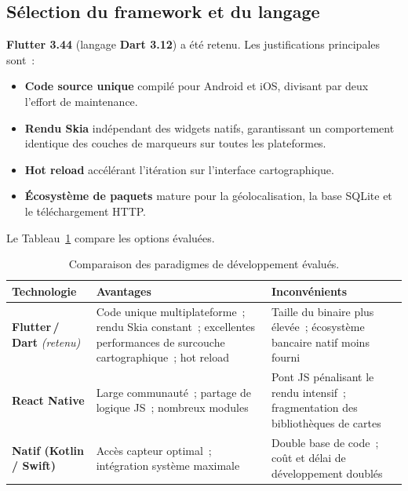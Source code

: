 \documentclass[11pt,a4paper]{article}
\begin{document}
\subsection{S\'election du framework et du langage}
\textbf{Flutter 3.44} (langage \textbf{Dart 3.12}) a \'et\'e retenu. Les
justifications principales sont~:
\begin{itemize}[leftmargin=1.4em]
  \item \textbf{Code source unique} compil\'e pour Android et iOS, divisant par
  deux l'effort de maintenance.
  \item \textbf{Rendu Skia} ind\'ependant des widgets natifs, garantissant un
  comportement identique des couches de marqueurs sur toutes les plateformes.
  \item \textbf{Hot reload} acc\'el\'erant l'it\'eration sur l'interface
  cartographique.
  \item \textbf{\'Ecosyst\`eme de paquets} mature pour la g\'eolocalisation, la
  base SQLite et le t\'el\'echargement HTTP.
\end{itemize}
Le Tableau~\ref{tab:framework-fr} compare les options \'evalu\'ees.

\begin{table}[ht]
\centering
\caption{Comparaison des paradigmes de d\'eveloppement \'evalu\'es.}
\label{tab:framework-fr}
\small
\begin{tabular}{>{\raggedright\arraybackslash}p{2.6cm} >{\raggedright\arraybackslash}p{5.4cm} >{\raggedright\arraybackslash}p{5.4cm}}
\toprule
\textbf{Technologie} & \textbf{Avantages} & \textbf{Inconv\'enients} \\
\midrule
\textbf{Flutter\,/\,Dart} \textit{(retenu)} &
Code unique multiplateforme~; rendu Skia constant~; excellentes performances de
surcouche cartographique~; hot reload &
Taille du binaire plus \'elev\'ee~; \'ecosyst\`eme bancaire natif moins fourni \\
\midrule
\textbf{React Native} &
Large communaut\'e~; partage de logique JS~; nombreux modules &
Pont JS p\'enalisant le rendu intensif~; fragmentation des biblioth\`eques de
cartes \\
\midrule
\textbf{Natif (Kotlin / Swift)} &
Acc\`es capteur optimal~; int\'egration syst\`eme maximale &
Double base de code~; co\^ut et d\'elai de d\'eveloppement doubl\'es \\
\bottomrule
\end{tabular}
\end{table}
\end{document}
